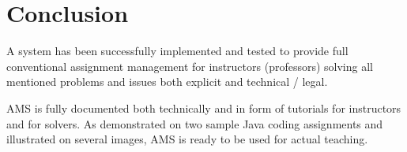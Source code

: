 \chapter{Conclusion} \label{chap:conclusion}

A system has been successfully implemented and tested to provide full conventional assignment management for instructors (professors) solving all mentioned problems and issues both explicit and technical / legal.

AMS is fully documented both technically and in form of tutorials for instructors and for solvers. As demonstrated on two sample Java coding assignments and illustrated on several images, AMS is ready to be used for actual teaching.
